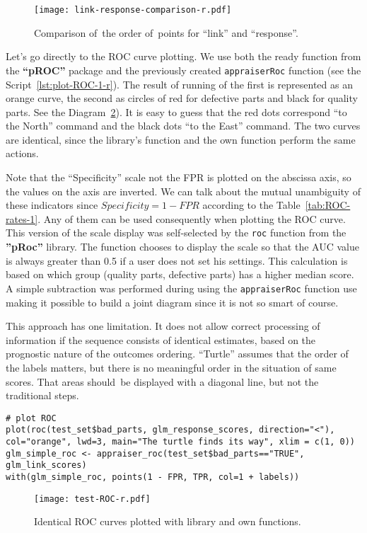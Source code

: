 \documentclass[]{scrreprt}
\begin{document}
%
\begin{figure}[htp]
	\centering
	\texttt{[image: link-response-comparison-r.pdf]}
	\caption{Comparison of~the order of~points for ``link'' and ``response''.}
	\label{fig:link-response-comparison-r}
\end{figure}
%

Let's go directly to the ROC curve plotting. We use both the ready function from the \textbf{``pROC''} package and the previously created \texttt{appraiserRoc} function (see the Script~\ref{lst:plot-ROC-1-r}). The result of running of the first is represented as an orange curve, the second as circles of red for defective parts and black for quality parts. See the Diagram~\ref{fig:test-ROC-r}). It is easy to guess that the red dots correspond ``to the North'' command and the black dots ``to the East'' command. The two curves are identical, since the library's function and the own function perform the same actions.

Note that the ``Specificity'' scale not the FPR is plotted on the abscissa axis, so the values on the axis are inverted. We can talk about the mutual unambiguity of these indicators since $Specificity = 1 - FPR$ according to the Table~\ref{tab:ROC-rates-1}. Any of them can be used consequently when plotting the ROC curve. This version of the scale display was self-selected by the \texttt{roc} function from the \textbf{''pRoc''} library. The function chooses to display the scale so that the AUC value is always greater than 0.5 if a user does not set his settings. This calculation is based on which group (quality parts, defective parts) has a higher median score. A simple subtraction was performed during using the \texttt{appraiserRoc} function use making it possible to build a joint diagram since it is not so smart of course.

This approach has one limitation.  It does not allow correct processing of information if the sequence consists of identical estimates, based on the prognostic nature of the outcomes ordering. ``Turtle'' assumes that the order of the labels matters, but there is no meaningful order in the situation of same scores. That areas should~be displayed with a diagonal line, but not the traditional steps.
%
\begin{lstlisting}[float=htp, caption = Plotting the ROC curve using library and own functions, firstnumber=1, label= lst:plot-ROC-1-r]
# plot ROC
plot(roc(test_set$bad_parts, glm_response_scores, direction="<"),
col="orange", lwd=3, main="The turtle finds its way", xlim = c(1, 0))
glm_simple_roc <- appraiser_roc(test_set$bad_parts=="TRUE", glm_link_scores)
with(glm_simple_roc, points(1 - FPR, TPR, col=1 + labels))
\end{lstlisting}
%
\begin{figure}[htp]
	\centering
	\texttt{[image: test-ROC-r.pdf]}
	\caption{Identical ROC curves plotted with library and own functions.}
	\label{fig:test-ROC-r}
\end{figure}
%
\end{document}
